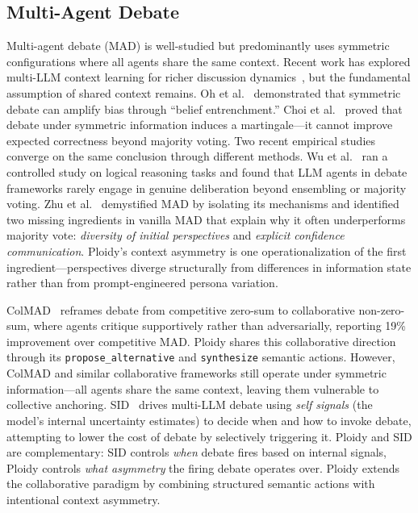 \documentclass[11pt]{article}
\begin{document}
\subsection{Multi-Agent Debate}
\label{sec:mad}

Multi-agent debate (MAD) is well-studied but predominantly uses symmetric configurations where all agents share the same context. Recent work has explored multi-LLM context learning for richer discussion dynamics~\citep{m2cl2026}, but the fundamental assumption of shared context remains. Oh et al.~\citep{oh2025dreamad} demonstrated that symmetric debate can amplify bias through ``belief entrenchment.'' Choi et al.~\citep{choi2025debate} proved that debate under symmetric information induces a martingale---it cannot improve expected correctness beyond majority voting. Two recent empirical studies converge on the same conclusion through different methods. Wu et al.~\citep{wu2025reallydebate} ran a controlled study on logical reasoning tasks and found that LLM agents in debate frameworks rarely engage in genuine deliberation beyond ensembling or majority voting. Zhu et al.~\citep{zhu2026demystifying} demystified MAD by isolating its mechanisms and identified two missing ingredients in vanilla MAD that explain why it often underperforms majority vote: \emph{diversity of initial perspectives} and \emph{explicit confidence communication}. Ploidy's context asymmetry is one operationalization of the first ingredient---perspectives diverge structurally from differences in information state rather than from prompt-engineered persona variation.

ColMAD~\citep{chen2025colmad} reframes debate from competitive zero-sum to collaborative non-zero-sum, where agents critique supportively rather than adversarially, reporting 19\% improvement over competitive MAD. Ploidy shares this collaborative direction through its \texttt{propose\_alternative} and \texttt{synthesize} semantic actions. However, ColMAD and similar collaborative frameworks still operate under symmetric information---all agents share the same context, leaving them vulnerable to collective anchoring. SID~\citep{chen2025sid} drives multi-LLM debate using \emph{self signals} (the model's internal uncertainty estimates) to decide when and how to invoke debate, attempting to lower the cost of debate by selectively triggering it. Ploidy and SID are complementary: SID controls \emph{when} debate fires based on internal signals, Ploidy controls \emph{what asymmetry} the firing debate operates over. Ploidy extends the collaborative paradigm by combining structured semantic actions with intentional context asymmetry.
\end{document}
